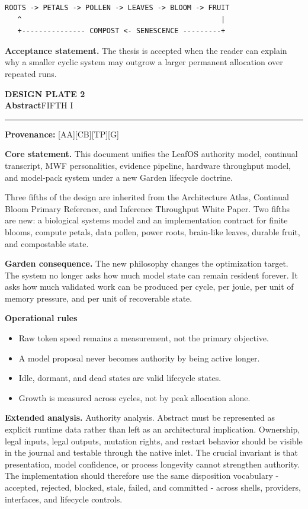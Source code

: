 \documentclass[10pt,letterpaper,oneside]{article}
\newcommand{\prov}[1]{\textcolor{gardenBlue}{\sffamily\footnotesize\textbf{Provenance:} #1}}
\newcommand{\platetitle}[3]{%
  \begin{minipage}[t][0.54in][t]{\textwidth}
  {\sffamily\bfseries\color{gardenDeep}\fontsize{9}{10}\selectfont DESIGN PLATE #1}\\[-1pt]
  {\sffamily\bfseries\color{gardenInk}\fontsize{16.5}{18}\selectfont #2}\hfill{\sffamily\color{gardenGreen}\large #3}
  \end{minipage}\vspace{-2pt}\hrule\vspace{5pt}}
\begin{document}
\begin{lstlisting}
ROOTS -> PETALS -> POLLEN -> LEAVES -> BLOOM -> FRUIT
   ^                                               |
   +--------------- COMPOST <- SENESCENCE ---------+
\end{lstlisting}
\begin{acceptbox}
\textbf{Acceptance statement.} The thesis is accepted when the reader can explain why a smaller cyclic system may outgrow a larger permanent allocation over repeated runs.
\end{acceptbox}
\newpage
\platetitle{2}{Abstract}{FIFTH I}
\prov{[AA][CB][TP][G]}
\fontsize{8.85}{10.45}\selectfont
\begin{corebox}
\textbf{Core statement.} This document unifies the LeafOS authority model, continual transcript, MWF personalities, evidence pipeline, hardware throughput model, and model-pack system under a new Garden lifecycle doctrine.
\end{corebox}
Three fifths of the design are inherited from the Architecture Atlas, Continual Bloom Primary Reference, and Inference Throughput White Paper. Two fifths are new: a biological systems model and an implementation contract for finite blooms, compute petals, data pollen, power roots, brain-like leaves, durable fruit, and compostable state.

\textbf{Garden consequence.} The new philosophy changes the optimization target. The system no longer asks how much model state can remain resident forever. It asks how much validated work can be produced per cycle, per joule, per unit of memory pressure, and per unit of recoverable state.

\textbf{Operational rules}
\begin{itemize}
\item Raw token speed remains a measurement, not the primary objective.
\item A model proposal never becomes authority by being active longer.
\item Idle, dormant, and dead states are valid lifecycle states.
\item Growth is measured across cycles, not by peak allocation alone.
\end{itemize}
\textbf{Extended analysis.} Authority analysis. Abstract must be represented as explicit runtime data rather than left as an architectural implication. Ownership, legal inputs, legal outputs, mutation rights, and restart behavior should be visible in the journal and testable through the native inlet. The crucial invariant is that presentation, model confidence, or process longevity cannot strengthen authority. The implementation should therefore use the same disposition vocabulary - accepted, rejected, blocked, stale, failed, and committed - across shells, providers, interfaces, and lifecycle controls.
\end{document}
